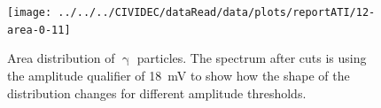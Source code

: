 

\begin{figure}[!t]
\centering
\texttt{[image: ../../../CIVIDEC/dataRead/data/plots/reportATI/12-area-0-11]} 
\caption{Area distribution of $\upgamma$ particles. The spectrum after cuts is using the amplitude qualifier of 18~mV to show how the shape of the distribution changes for different amplitude thresholds.
}
\label{fig:1dcoarea}
\end{figure}


%



